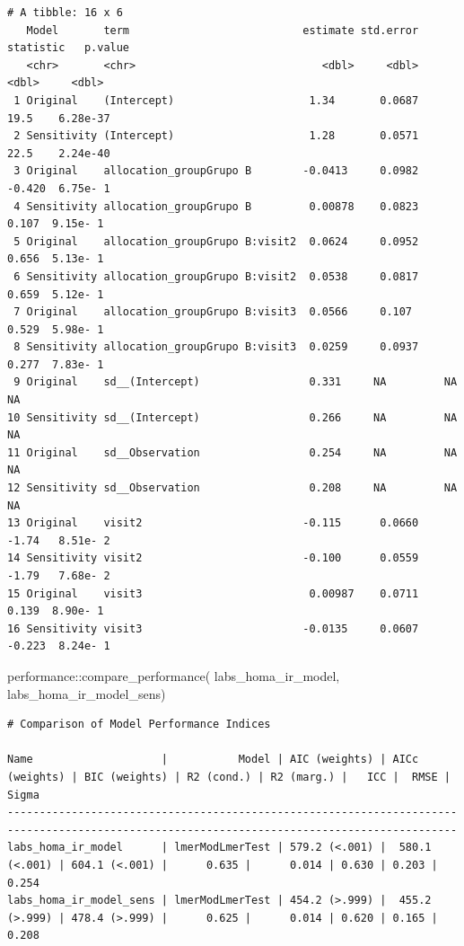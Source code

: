 \documentclass[
  12pt,
]{article}
\newenvironment{Shaded}{\begin{snugshade}}{\end{snugshade}}
\newcommand{\FunctionTok}[1]{\textcolor[rgb]{0.28,0.35,0.67}{#1}}
\newcommand{\NormalTok}[1]{\textcolor[rgb]{0.00,0.23,0.31}{#1}}
\newcommand{\SpecialCharTok}[1]{\textcolor[rgb]{0.37,0.37,0.37}{#1}}
\begin{document}
\begin{verbatim}
# A tibble: 16 x 6
   Model       term                           estimate std.error statistic   p.value
   <chr>       <chr>                             <dbl>     <dbl>     <dbl>     <dbl>
 1 Original    (Intercept)                     1.34       0.0687    19.5    6.28e-37
 2 Sensitivity (Intercept)                     1.28       0.0571    22.5    2.24e-40
 3 Original    allocation_groupGrupo B        -0.0413     0.0982    -0.420  6.75e- 1
 4 Sensitivity allocation_groupGrupo B         0.00878    0.0823     0.107  9.15e- 1
 5 Original    allocation_groupGrupo B:visit2  0.0624     0.0952     0.656  5.13e- 1
 6 Sensitivity allocation_groupGrupo B:visit2  0.0538     0.0817     0.659  5.12e- 1
 7 Original    allocation_groupGrupo B:visit3  0.0566     0.107      0.529  5.98e- 1
 8 Sensitivity allocation_groupGrupo B:visit3  0.0259     0.0937     0.277  7.83e- 1
 9 Original    sd__(Intercept)                 0.331     NA         NA     NA       
10 Sensitivity sd__(Intercept)                 0.266     NA         NA     NA       
11 Original    sd__Observation                 0.254     NA         NA     NA       
12 Sensitivity sd__Observation                 0.208     NA         NA     NA       
13 Original    visit2                         -0.115      0.0660    -1.74   8.51e- 2
14 Sensitivity visit2                         -0.100      0.0559    -1.79   7.68e- 2
15 Original    visit3                          0.00987    0.0711     0.139  8.90e- 1
16 Sensitivity visit3                         -0.0135     0.0607    -0.223  8.24e- 1
\end{verbatim}

\begin{Shaded}
\begin{Highlighting}[]
\NormalTok{performance}\SpecialCharTok{::}\FunctionTok{compare\_performance}\NormalTok{(}
\NormalTok{    labs\_homa\_ir\_model, }
\NormalTok{    labs\_homa\_ir\_model\_sens) }
\end{Highlighting}
\end{Shaded}

\begin{verbatim}
# Comparison of Model Performance Indices

Name                    |           Model | AIC (weights) | AICc (weights) | BIC (weights) | R2 (cond.) | R2 (marg.) |   ICC |  RMSE | Sigma
--------------------------------------------------------------------------------------------------------------------------------------------
labs_homa_ir_model      | lmerModLmerTest | 579.2 (<.001) |  580.1 (<.001) | 604.1 (<.001) |      0.635 |      0.014 | 0.630 | 0.203 | 0.254
labs_homa_ir_model_sens | lmerModLmerTest | 454.2 (>.999) |  455.2 (>.999) | 478.4 (>.999) |      0.625 |      0.014 | 0.620 | 0.165 | 0.208
\end{verbatim}
\end{document}
